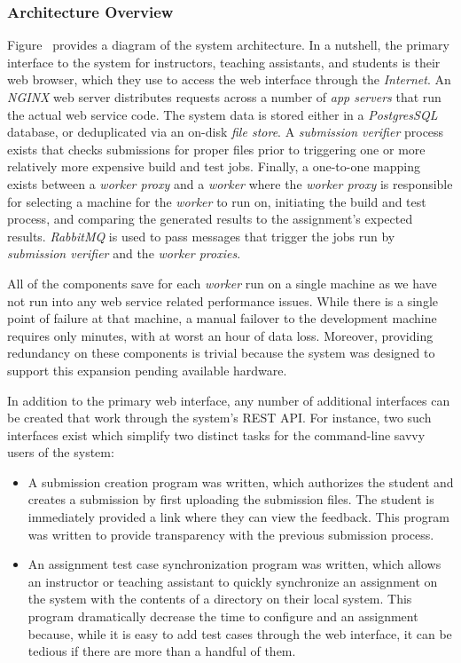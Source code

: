 \subsubsection{Architecture Overview}
Figure~ provides a diagram of the system
architecture. In a nutshell, the primary interface to the system for
instructors, teaching assistants, and students is their web browser, which they
use to access the web interface through the \emph{Internet}. An \emph{NGINX}
web server distributes requests across a number of \emph{app servers} that run
the actual web service code. The system data is stored either in a
\emph{PostgresSQL} database, or deduplicated via an on-disk \emph{file
  store}. A \emph{submission verifier} process exists that checks submissions
for proper files prior to triggering one or more relatively more expensive
build and test jobs. Finally, a one-to-one mapping exists between a
\emph{worker proxy} and a \emph{worker} where the \emph{worker proxy} is
responsible for selecting a machine for the \emph{worker} to run on, initiating
the build and test process, and comparing the generated results to the
assignment's expected results. \emph{RabbitMQ} is used to pass messages that
trigger the jobs run by \emph{submission verifier} and the \emph{worker
  proxies}.

All of the components save for each \emph{worker} run on a single machine as we
have not run into any web service related performance issues. While there is a
single point of failure at that machine, a manual failover to the development
machine requires only minutes, with at worst an hour of data loss. Moreover,
providing redundancy on these components is trivial because the system was
designed to support this expansion pending available hardware.

In addition to the primary web interface, any number of additional interfaces
can be created that work through the system's REST API. For instance, two such
interfaces exist which simplify two distinct tasks for the command-line savvy
users of the system:

\begin{itemize}
\item A submission creation program was written, which authorizes the student
  and creates a submission by first uploading the submission files. The student
  is immediately provided a link where they can view the feedback. This program
  was written to provide transparency with the previous submission process.
\item An assignment test case synchronization program was written, which allows
  an instructor or teaching assistant to quickly synchronize an assignment on
  the system with the contents of a directory on their local system. This
  program dramatically decrease the time to configure and an assignment
  because, while it is easy to add test cases through the web interface, it can
  be tedious if there are more than a handful of them.
\end{itemize}
